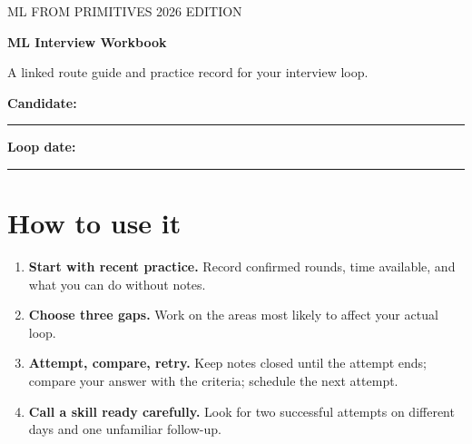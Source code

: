 \documentclass[10pt,letterpaper]{article}
\newcommand{\sectionrule}{\vspace{.1in}\noindent{\color{rule}\rule{\linewidth}{.5pt}}\vspace{.1in}}
\begin{document}
{\color{accent}\sffamily\small ML FROM PRIMITIVES \hfill 2026 EDITION\par}
\vspace{.25in}
{\Huge\bfseries ML Interview Workbook\par}
\vspace{.08in}
{\large A linked route guide and practice record for your interview loop.\par}
\vspace{.18in}
\vspace{.18in}
\textbf{Candidate:} \rule{.25\linewidth}{.35pt}\hfill \textbf{Loop date:} \rule{.16\linewidth}{.35pt}

\section*{How to use it}
\begin{enumerate}
  \item \textbf{Start with recent practice.} Record confirmed rounds, time available, and what you can do without notes.
  \item \textbf{Choose three gaps.} Work on the areas most likely to affect your actual loop.
  \item \textbf{Attempt, compare, retry.} Keep notes closed until the attempt ends; compare your answer with the criteria; schedule the next attempt.
  \item \textbf{Call a skill ready carefully.} Look for two successful attempts on different days and one unfamiliar follow-up.
\end{enumerate}

\sectionrule
\end{document}
